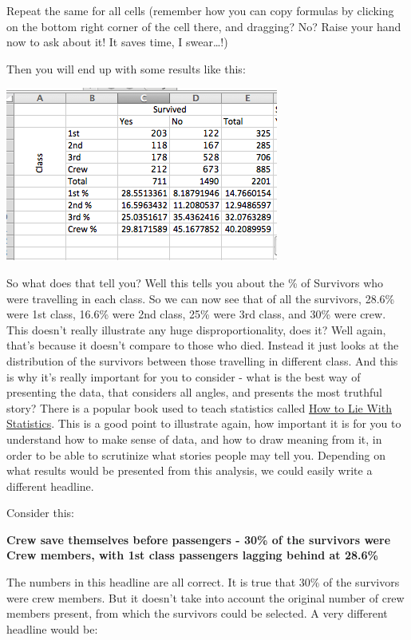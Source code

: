 \documentclass[]{book}
\theoremstyle{definition}
\theoremstyle{definition}
\theoremstyle{definition}
\theoremstyle{remark}
\begin{document}
Repeat the same for all cells (remember how you can copy formulas by
clicking on the bottom right corner of the cell there, and dragging? No?
Raise your hand now to ask about it! It saves time, I swear\ldots{}!)

Then you will end up with some results like this:

\includegraphics{imgs/all_col_perc.png}

So what does that tell you? Well this tells you about the \% of
Survivors who were travelling in each class. So we can now see that of
all the survivors, 28.6\% were 1st class, 16.6\% were 2nd class, 25\%
were 3rd class, and 30\% were crew. This doesn't really illustrate any
huge disproportionality, does it? Well again, that's because it doesn't
compare to those who died. Instead it just looks at the distribution of
the survivors between those travelling in different class. And this is
why it's really important for you to consider - what is the best way of
presenting the data, that considers all angles, and presents the most
truthful story? There is a popular book used to teach statistics called
\href{https://en.wikipedia.org/wiki/How_to_Lie_with_Statistics}{How to
Lie With Statistics}. This is a good point to illustrate again, how
important it is for you to understand how to make sense of data, and how
to draw meaning from it, in order to be able to scrutinize what stories
people may tell you. Depending on what results would be presented from
this analysis, we could easily write a different headline.

Consider this:

\textbf{Crew save themselves before passengers - 30\% of the survivors
were Crew members, with 1st class passengers lagging behind at 28.6\%}

The numbers in this headline are all correct. It is true that 30\% of
the survivors were crew members. But it doesn't take into account the
original number of crew members present, from which the survivors could
be selected. A very different headline would be:
\end{document}
